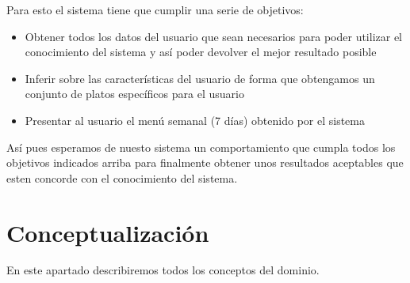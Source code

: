 \documentclass[11]{article}
\begin{document}
Para esto el sistema tiene que cumplir una serie de objetivos: 
\begin{itemize}
	\item Obtener todos los datos del usuario que sean necesarios para poder utilizar el conocimiento del sistema y así poder devolver el mejor resultado posible
	\item Inferir sobre las características del usuario de forma que obtengamos un conjunto de platos específicos para el usuario
	\item Presentar al usuario el menú semanal (7 días) obtenido por el sistema		
\end{itemize}

Así pues esperamos de nuesto sistema un comportamiento que cumpla todos los objetivos indicados arriba para finalmente obtener unos resultados aceptables que esten concorde con el conocimiento del sistema. 
\section{Conceptualización}
En este apartado describiremos todos los conceptos del dominio. 
\end{document}
